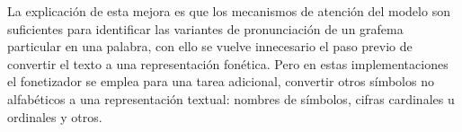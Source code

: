 La explicación de esta mejora es que los mecanismos de atención del modelo son suficientes para identificar las variantes de pronunciación de un grafema particular en una palabra, con ello se vuelve innecesario el paso previo de convertir el texto a una representación fonética. Pero en estas implementaciones el fonetizador se emplea para una tarea adicional, convertir otros símbolos no alfabéticos a una representación textual: nombres de símbolos, cifras cardinales u ordinales y otros.




\newpage 